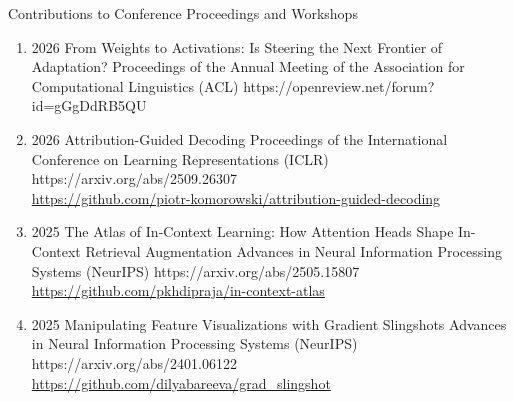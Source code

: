 \headedsubsection %
{Contributions to Conference Proceedings and Workshops}{}
{
    \begin{enumerate}
        



        \item {}
                        {2026}
                        {From Weights to Activations: Is Steering the Next Frontier of Adaptation?}
                        {Proceedings of the Annual Meeting of the Association for Computational Linguistics (ACL)}
                        {}
                        {https://openreview.net/forum?id=gGgDdRB5QU}

        \item {}
                        {2026}
                        {Attribution-Guided Decoding}
                        {Proceedings of the International Conference on Learning Representations (ICLR)}
                        {}
                        {https://arxiv.org/abs/2509.26307}
                        {
                            \\\href{https://github.com/piotr-komorowski/attribution-guided-decoding}{https://github.com/piotr-komorowski/attribution-guided-decoding}
                        }

        \item {}
                        {2025}
                        {The Atlas of In-Context Learning: How Attention Heads Shape In-Context Retrieval Augmentation}
                        {Advances in Neural Information Processing Systems (NeurIPS)}
                        {}
                        {https://arxiv.org/abs/2505.15807}
                        {
                            \\\href{https://github.com/pkhdipraja/in-context-atlas}{https://github.com/pkhdipraja/in-context-atlas}
                        }

        \item {}
                        {2025}
                        {Manipulating Feature Visualizations with Gradient Slingshots}
                        {Advances in Neural Information Processing Systems (NeurIPS)}
                        {}
                        {https://arxiv.org/abs/2401.06122}
                        {
                            \\\href{https://github.com/dilyabareeva/grad_slingshot}{https://github.com/dilyabareeva/grad\_slingshot}
                        }


\end{enumerate}}
